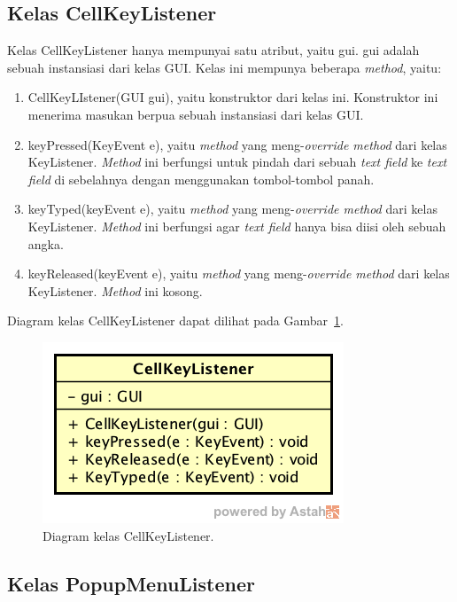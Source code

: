 \subsection{Kelas CellKeyListener}
\label{sec:kelascellkeylistener}

Kelas CellKeyListener hanya mempunyai satu atribut, yaitu gui. gui adalah sebuah instansiasi dari kelas GUI. Kelas ini mempunya beberapa \textit{method}, yaitu:

\begin{enumerate}
\item CellKeyLIstener(GUI gui), yaitu konstruktor dari kelas ini. Konstruktor ini menerima masukan berpua sebuah instansiasi dari kelas GUI.
\item keyPressed(KeyEvent e), yaitu \textit{method} yang meng-\textit{override method} dari kelas KeyListener. \textit{Method} ini berfungsi untuk pindah dari sebuah \textit{text field} ke \textit{text field} di sebelahnya dengan menggunakan tombol-tombol panah.
\item keyTyped(keyEvent e), yaitu \textit{method} yang meng-\textit{override method} dari kelas KeyListener. \textit{Method} ini berfungsi agar \textit{text field} hanya bisa diisi oleh sebuah angka.
\item keyReleased(keyEvent e), yaitu \textit{method} yang meng-\textit{override method} dari kelas KeyListener. \textit{Method} ini kosong.
\end{enumerate}

Diagram kelas CellKeyListener dapat dilihat pada Gambar~\ref{fig:diagramkelascellkeylistener}.

\begin{figure}
\centering
\captionsetup{justification=centering}
\includegraphics[scale=0.5]{Gambar/Perancangan/DiagramKelasCellKeyListener.png}
\caption[Diagram kelas CellKeyListener.]{Diagram kelas CellKeyListener.}
\label{fig:diagramkelascellkeylistener}
\end{figure}

\subsection{Kelas PopupMenuListener}
\label{sec:kelaspopupmenulistener}

